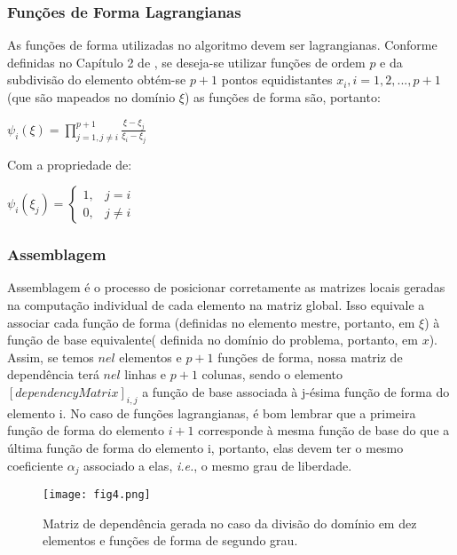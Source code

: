 \documentclass[11pt, oneside]{article}   	%
\begin{document}
\subsubsection{Funções de Forma Lagrangianas}
As funções de forma utilizadas no algoritmo devem ser lagrangianas. Conforme definidas no Capítulo 2 de \citet{oden81}, se deseja-se utilizar funções de ordem $p$ e da subdivisão do elemento obtém-se $p+1$  pontos equidistantes $x_{i},i=1,2,...,p+1$(que são mapeados no domínio $\xi$) as funções de forma são, portanto:

\centerline{$\psi_{i}(\xi)=\prod_{j=1,j\neq i}^{p+1}\frac{\xi-\xi_{j}}{\xi_{i}-\xi_{j}}$} 

Com a propriedade de: 
		
 \centerline{$\psi_{i}(\xi_{j})	=\begin{cases} 
 1, & j=i\\ 
 0, & j\neq i
 \end{cases}	$}		
 \subsubsection{Assemblagem}
 \label{sub:assemblagem}
 Assemblagem é o processo de posicionar corretamente as matrizes locais geradas na computação individual de cada elemento na matriz global. Isso equivale a associar cada função de forma (definidas no elemento mestre, portanto, em $\xi$) à função de base equivalente( definida no domínio do problema, portanto, em $x$). Assim, se temos $nel$ elementos e $p+1$ funções de forma, nossa matriz de dependência terá $nel$ linhas e $p+1$ colunas, sendo o elemento $[dependencyMatrix]_{i,j}$  a função de base associada à j-ésima função de forma do elemento i. No caso de funções lagrangianas, é bom lembrar que a primeira função de forma do elemento $i+1$ corresponde à mesma função de base do que a última função de forma do elemento i, portanto, elas devem ter o mesmo coeficiente $\alpha_{j}$ associado a elas, \emph{i.e.}, o mesmo grau de liberdade.
 \begin{figure}[h!]
  \centering
      \texttt{[image: fig4.png]}
  \caption{Matriz de dependência gerada no caso da divisão do domínio em dez elementos e funções de forma de segundo grau.}
  \label{fig:dependencymatrix}
\end{figure}
\end{document}
